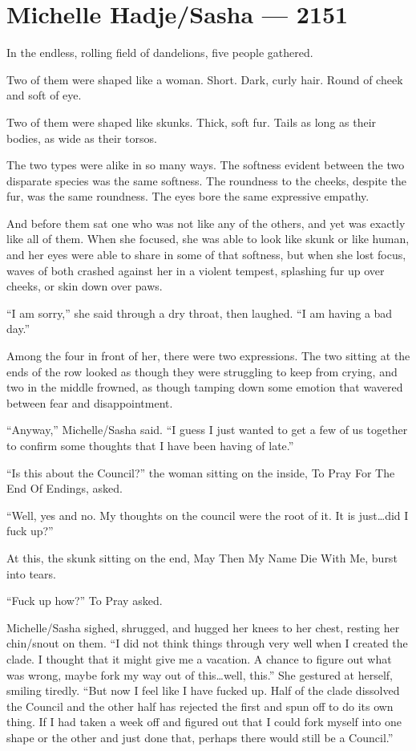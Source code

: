 \hypertarget{michelle-hadjesasha-2151}{%
\chapter{Michelle Hadje/Sasha — 2151}\label{michelle-hadjesasha-2151}}

In the endless, rolling field of dandelions, five people gathered.

Two of them were shaped like a woman. Short. Dark, curly hair. Round of cheek and soft of eye.

Two of them were shaped like skunks. Thick, soft fur. Tails as long as their bodies, as wide as their torsos.

The two types were alike in so many ways. The softness evident between the two disparate species was the same softness. The roundness to the cheeks, despite the fur, was the same roundness. The eyes bore the same expressive empathy.

And before them sat one who was not like any of the others, and yet was exactly like all of them. When she focused, she was able to look like skunk or like human, and her eyes were able to share in some of that softness, but when she lost focus, waves of both crashed against her in a violent tempest, splashing fur up over cheeks, or skin down over paws.

``I am sorry,'' she said through a dry throat, then laughed. ``I am having a bad day.''

Among the four in front of her, there were two expressions. The two sitting at the ends of the row looked as though they were struggling to keep from crying, and two in the middle frowned, as though tamping down some emotion that wavered between fear and disappointment.

``Anyway,'' Michelle/Sasha said. ``I guess I just wanted to get a few of us together to confirm some thoughts that I have been having of late.''

``Is this about the Council?'' the woman sitting on the inside, To Pray For The End Of Endings, asked.

``Well, yes and no. My thoughts on the council were the root of it. It is just\ldots did I fuck up?''

At this, the skunk sitting on the end, May Then My Name Die With Me, burst into tears.

``Fuck up how?'' To Pray asked.

Michelle/Sasha sighed, shrugged, and hugged her knees to her chest, resting her chin/snout on them. ``I did not think things through very well when I created the clade. I thought that it might give me a vacation. A chance to figure out what was wrong, maybe fork my way out of this\ldots well, this.'' She gestured at herself, smiling tiredly. ``But now I feel like I have fucked up. Half of the clade dissolved the Council and the other half has rejected the first and spun off to do its own thing. If I had taken a week off and figured out that I could fork myself into one shape or the other and just done that, perhaps there would still be a Council.''

